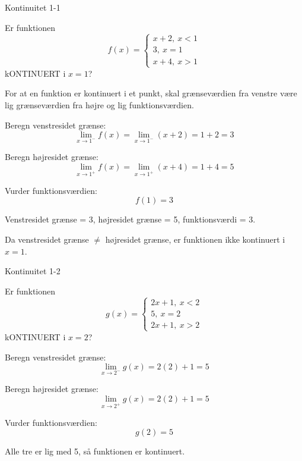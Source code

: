 \documentclass{article}
\begin{document}

\tableofcontents
\newpage

\begin{exercise}{Kontinuitet 1-1}

Er funktionen
\[
 f(x) = \begin{cases}
 x + 2, \ x < 1 \\
 3, \ x = 1 \\
 x + 4, \ x > 1
 \end{cases}
\]
kONTINUERT i $x = 1$?


\hint

For at en funktion er kontinuert i et punkt, skal grænseværdien fra venstre være lig grænseværdien fra højre og lig funktionsværdien.

\hint

Beregn venstresidet grænse:
\[
\lim_{x \to 1^-} f(x) = \lim_{x \to 1^-} (x + 2) = 1 + 2 = 3
\]

\hint

Beregn højresidet grænse:
\[
\lim_{x \to 1^+} f(x) = \lim_{x \to 1^+} (x + 4) = 1 + 4 = 5
\]

\hint

Vurder funktionsværdien:
\[
f(1) = 3
\]

\hint

Venstresidet grænse = 3, højresidet grænse = 5, funktionsværdi = 3.

\hint

Da venstresidet grænse $\neq$ højresidet grænse, er funktionen ikke kontinuert i $x = 1$.

\end{exercise}

\newpage

\begin{exercise}{Kontinuitet 1-2}

Er funktionen
\[
 g(x) = \begin{cases}
 2x + 1, \ x < 2 \\
 5, \ x = 2 \\
 2x + 1, \ x > 2
 \end{cases}
\]
kONTINUERT i $x = 2$?


\hint

Beregn venstresidet grænse:
\[
\lim_{x \to 2^-} g(x) = 2(2) + 1 = 5
\]

\hint

Beregn højresidet grænse:
\[
\lim_{x \to 2^+} g(x) = 2(2) + 1 = 5
\]

\hint

Vurder funktionsværdien:
\[
g(2) = 5
\]

\hint

Alle tre er lig med 5, så funktionen er kontinuert.

\end{exercise}
\end{document}
